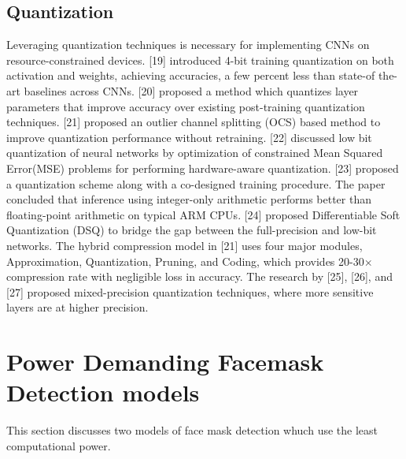 \documentclass[12pt,a4paper]{article}
\begin{document}
\subsection{Quantization}
Leveraging quantization techniques is necessary for implementing CNNs on
resource-constrained devices. [19] introduced 4-bit training quantization on both
activation and weights, achieving accuracies, a few percent less than state-of the-art baselines across CNNs. [20] proposed a method which quantizes layer
parameters that improve accuracy over existing post-training quantization techniques. [21] proposed an outlier channel splitting (OCS) based method to improve quantization performance without retraining. [22] discussed low bit quantization of neural networks by optimization of constrained Mean Squared Error(MSE) problems for performing hardware-aware quantization. [23] proposed a quantization scheme along with a co-designed training procedure. The paper concluded that inference using integer-only arithmetic performs better than
floating-point arithmetic on typical ARM CPUs. [24] proposed Differentiable Soft
Quantization (DSQ) to bridge the gap between the full-precision and low-bit
networks. The hybrid compression model in [21] uses four major modules, Approximation, Quantization, Pruning, and Coding, which provides 20-30$\times$  compression rate with negligible loss in accuracy. The research by [25], [26], and [27]
proposed mixed-precision quantization techniques, where more sensitive layers
are at higher precision.


\section{ Power Demanding Facemask Detection models}
This section discusses two models of face mask detection whuch use the least computational power.
\end{document}
